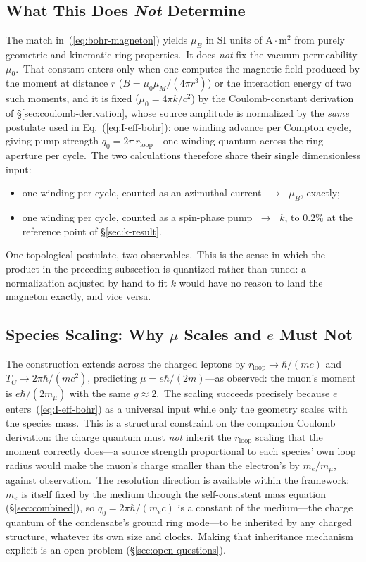\documentclass[12pt,letterpaper]{article}
\newcommand{\rloop}{r_{\mathrm{loop}}}
\begin{document}
\subsection{What This Does \emph{Not} Determine}

The match in~(\ref{eq:bohr-magneton}) yields $\mu_B$ in SI units of
$\mathrm{A\cdot m^2}$ from purely geometric and kinematic ring
properties.\ It does \emph{not} fix the vacuum permeability $\mu_0$.\
That constant enters only when one computes the magnetic field produced
by the moment at distance $r$ ($B = \mu_0\mu_M/(4\pi r^3)$) or the
interaction energy of two such moments, and it is fixed
($\mu_0 = 4\pi k/c^2$) by the Coulomb-constant derivation of
§\ref{sec:coulomb-derivation}, whose source amplitude is normalized by
the \emph{same} postulate used in Eq.~(\ref{eq:I-eff-bohr}): one winding
advance per Compton cycle, giving pump strength
$q_0 = 2\pi\,\rloop$---one winding quantum across the ring aperture per
cycle.\ The two calculations therefore share their single dimensionless
input:
\begin{itemize}
\item one winding per cycle, counted as an azimuthal current
  $\;\rightarrow\;$ $\mu_B$, exactly;
\item one winding per cycle, counted as a spin-phase pump
  $\;\rightarrow\;$ $k$, to $0.2\%$ at the reference point of
  §\ref{sec:k-result}.
\end{itemize}
One topological postulate, two observables.\ This is the sense in which
the product in the preceding subsection is quantized rather than tuned:
a normalization adjusted by hand to fit $k$ would have no reason to
land the magneton exactly, and vice versa.

\subsection{Species Scaling: Why $\mu$ Scales and $e$ Must Not}
\label{sec:species-scaling}

The construction extends across the charged leptons by
$\rloop \to \hbar/(m c)$ and $T_C \to 2\pi\hbar/(m c^2)$, predicting
$\mu = e\hbar/(2m)$---as observed: the muon's moment is
$e\hbar/(2m_\mu)$ with the same $g \approx 2$.\ The scaling succeeds
precisely because $e$ enters~(\ref{eq:I-eff-bohr}) as a universal input
while only the geometry scales with the species mass.\ This is a
structural constraint on the companion Coulomb derivation: the charge
quantum must \emph{not} inherit the $\rloop$ scaling that the moment
correctly does---a source strength proportional to each species' own
loop radius would make the muon's charge smaller than the electron's by
$m_e/m_\mu$, against observation.\ The resolution direction is
available within the framework: $m_e$ is itself fixed by the medium
through the self-consistent mass equation (§\ref{sec:combined}), so
$q_0 = 2\pi\hbar/(m_e c)$ is a constant of the medium---the charge
quantum of the condensate's ground ring mode---to be inherited by any
charged structure, whatever its own size and clocks.\ Making that
inheritance mechanism explicit is an open problem
(§\ref{sec:open-questions}).
\end{document}
